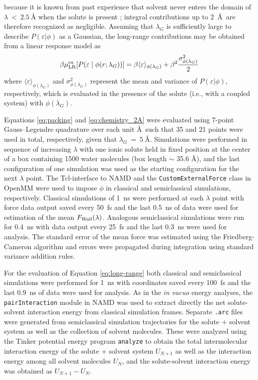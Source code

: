 \documentclass[journal=jacsat,articletitle=true,manuscript=suppinfo,layout=onecolumn]{achemso}
\begin{document}
    because it is known from past experience that solvent never enters the domain of $\lambda~<~2.5~\text{\AA}$ when the solute is present \cite{Tomar2016}; integral contributions up to 2~\AA\ are therefore recognized as negligible. Assuming that $\lambda_G$ is sufficiently large to describe $P(\varepsilon|\phi)$ as a Gaussian, the long-range contributions may be obtained from a linear response model as \cite{Tomar2016, Adhikari2022}
    \begin{eqnarray}
    \beta \mu^{\rm{ex}}_{\rm{LR}}[P(\varepsilon \; | \; \phi(r; \lambda_G))] = \beta \langle \varepsilon \rangle_{\phi(\lambda_G)} + \beta^2 \frac{\sigma_{\phi(\lambda_G)}^2}{2}
    \label{eq:long-range}
    \end{eqnarray}
    where $\langle \varepsilon \rangle_{\phi(\lambda_G)}$ and $\sigma_{\phi(\lambda_G)}^2$ represent the mean and variance  of $P(\varepsilon|\phi)$, respectively, which is evaluated in the presence of the solute (i.e., with a coupled system) with $\phi(\lambda_G)$. 

    Equations \ref{eq:packing} and \ref{eq:chemistry_2A} were evaluated using 7-point Gauss–Legendre quadrature \cite{Hummer1996a} over each unit \AA\ such that 35 and 21 points were used in total, respectively, given that $\lambda_G~=~5~\text{\AA}$. Simulations were performed in sequence of increasing $\lambda$ with one ionic solute held in fixed position at the center of a box containing 1500 water molecules (box length $\sim$ 35.6 \AA), and the last configuration of one simulation was used as the starting configuration for the next $\lambda$ point. The Tcl-interface to NAMD and the \texttt{CustomExternalForce} class in OpenMM were used to impose $\phi$ in classical and semiclassical simulations, respectively. Classical simulations of 1~ns were performed at each $\lambda$ point with force data output saved every 50~fs and the last 0.5~ns of data were used for estimation of the mean $F_{\rm{Wall}} (\lambda)$. Analogous semiclassical simulations were run for 0.4~ns with data output every 25~fs and the last 0.3~ns were used for analysis. The standard error of the mean force was estimated using the Friedberg-Cameron algorithm\cite{Friedberg1970, Allen1986} and errors were propagated during integration using standard variance addition rules.
    
    For the evaluation of Equation \ref{eq:long-range} both classical and semiclassical simulations were performed for 1~ns with coordinates saved every 100~fs and the last 0.9~ns of data were used for analysis. As in the \emph{in vacuo} energy analyses, the \texttt{pairInteraction} module in NAMD was used to extract directly the net solute-solvent interaction energy from classical simulation frames. Separate \texttt{.arc} files were generated from semiclassical simulation trajectories for the solute + solvent system as well as the collection of solvent molecules. These were analyzed using the Tinker potential energy program \texttt{analyze} to obtain the total intermolecular interaction energy of the solute + solvent system $U_{N+1}$ as well as the interaction energy among all solvent molecules $U_{N}$, and the solute-solvent interaction energy was obtained as $U_{N+1} - U_{N}$.
\end{document}
